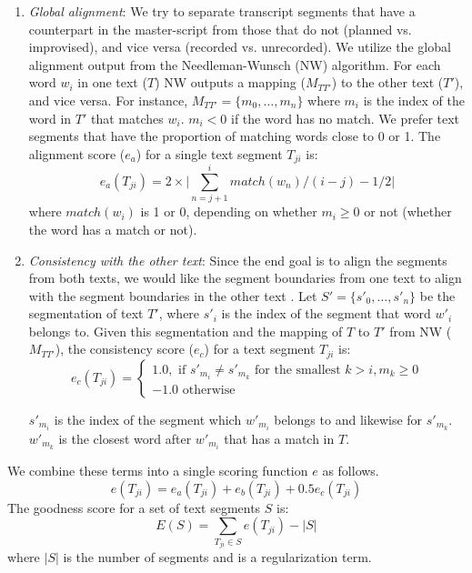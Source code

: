 \begin{enumerate}
\item{\textit{Global alignment}: We try to separate transcript segments that have a counterpart in the master-script from those that do not (planned vs. improvised), and vice versa (recorded vs. unrecorded). We utilize the global alignment output from the Needleman-Wunsch (NW) algorithm. For each word $w_i$ in one text ($T$) NW outputs a mapping ($M_{TT'}$) 
to the other text ($T'$), and vice versa. For instance, $M_{TT'} = \{m_0, \dots,m_n\}$ where $m_i$ is the index of the word in  $T'$ that matches $w_i$. $m_i < 0$ if the word has no match. We prefer text segments that have the proportion of matching words close to 0 or 1. The alignment score ($e_a$) for a single text segment $T_{ji}$ is:  
\begin{equation}
e_{a}(T_{ji}) = 2\times\bigg|\sum_{n=j+1}^{i}{match(w_n)}\big/(i-j) - 1/2 \bigg|
\end{equation}
where $match(w_i)$ is 1 or 0, depending on whether $m_i \geq 0$ or not (whether the word has a match or not).
}
\item{\textit{Consistency with the other text}: Since the end goal is to align the segments from both texts, we would like the segment boundaries from one text to align with the segment boundaries in the other text . Let $S' = \{s'_0, \dots, s'_n\}$ be the segmentation of text $T'$, where $s'_i$ is the index of the segment that word $w'_i$ belongs to. Given this segmentation and the mapping of $T$ to $T'$ from NW  ($M_{TT'}$), the consistency score ($e_c$) for a text segment $T_{ji}$ is:
\begin{equation}
    e_c(T_{ji})= 
\begin{cases}
   1.0, \text{ if } s'_{m_i} \neq s'_{m_k} \text{ for the smallest } k>i, m_k \geq0\\
   -1.0 \text{ otherwise }
\end{cases}
\end{equation}

$s'_{m_i}$ is the index of the segment which $w'_{m_i}$ belongs to and likewise for $s'_{m_k}$. $w'_{m_k}$ is the closest word after $w'_{m_i}$ that has a match in $T$.
} 
\end{enumerate}

We combine these terms into a single scoring function $e$ as follows. 
\begin{equation}
e(T_{ji}) = e_a(T_{ji}) + e_b(T_{ji}) + 0.5  e_c(T_{ji})
\end{equation}
The goodness score for a set of text segments $S$ is:
\begin{equation}
E(S) = \sum_{T_{ji}\in S}{e(T_{ji})} - \big|S\big|
\end{equation}
where $\big|S\big|$ is the number of segments and is a regularization term. 

